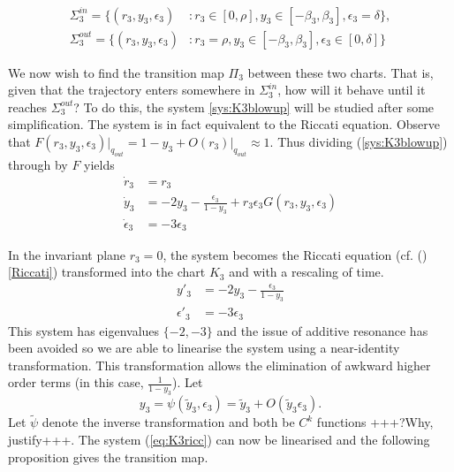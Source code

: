 \begin{align*} \Sigma_3^{in} =\lbrace(r_3,y_3,\epsilon_3) &: r_3\in[0,\rho], y_3 \in [-\beta_3,\beta_3], \epsilon_3=\delta\rbrace,\\
\Sigma_3^{out} =\lbrace(r_3,y_3,\epsilon_3) &: r_3=\rho, y_3 \in [-\beta_3,\beta_3], \epsilon_3\in[0,\delta]\rbrace
\end{align*}

We now wish to find the transition map $\Pi_3$ between these two charts. That is, given that the trajectory enters somewhere in $\Sigma_3^{in}$, how will it behave until it reaches $\Sigma_3^{out}$? To do this, the system \ref{sys:K3blowup} will be studied after some simplification. The system is in fact equivalent to the Riccati equation. Observe that $F(r_3,y_3,\epsilon_3)\big|_{q_{out}} = 1-y_3 + O(r_3)\big|_{q_{out}} \approx 1 $. Thus dividing (\ref{sys:K3blowup}) through by $F$ yields
\begin{subequations}
	\begin{align}
	\dot{r}_3&=r_3\\
	\dot{y}_3&=-2y_3 - \frac{\epsilon_3}{1-y_3}+r_3\epsilon_3 G(r_3,y_3,\epsilon_3)\\
	\dot{\epsilon}_3 &= -3\epsilon_3
	\end{align}
	\label{eq:K3ricc}
\end{subequations}

In the invariant plane $r_3=0$, the system becomes the Riccati equation (cf. ()\ref{Riccati}) transformed into the chart $K_3$ and with a rescaling of time.
\begin{align*}
y'_3 &= -2y_3-\frac{\epsilon_3}{1-y_3}\\
\epsilon'_3 &= -3\epsilon_3
\end{align*}
This system has eigenvalues $\lbrace -2,-3\rbrace$ and the issue of additive resonance has been avoided so we are able to linearise the system using a near-identity transformation. This transformation allows the elimination of awkward higher order terms (in this case, $\frac{1}{1-y_3}$). Let
$$y_3=\psi(\tilde{y}_3,\epsilon_3)=\tilde{y}_3+O(\tilde{y}_3\epsilon_3).$$
Let $\tilde{\psi}$ denote the inverse transformation and both be $C^k$ functions +++?Why, justify+++. The system (\ref{eq:K3ricc}) can now be linearised and the following proposition gives the transition map.


